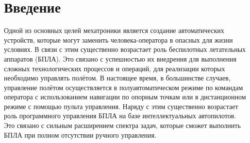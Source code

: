 \documentclass[a4paper, 14pt]{extarticle}
\let\Oldsection\section
\renewcommand{\section}{\FloatBarrier\Oldsection}
\begin{document}
\section{Введение}
Одной из основных целей мехатроники
является создание автоматических устройств, которые могут заменить
человека-оператора в опасных для жизни условиях. В связи с этим
существенно возрастает роль беспилотных летательных аппаратов (БПЛА).
Это связано с успешностью их внедрения для выполнения сложных
технологических процессов и операций, для реализации которых
необходимо управлять полётом. В настоящее время, в большинстве случаев, управление полётом
осуществляется в полуавтоматическом режиме по командам оператора с
использованием навигации по опорным точкам или в дистанционном режиме
с помощью пульта управления. Наряду с этим существенно возрастает роль
программного управления БПЛА на базе интеллектуальных автопилотов. Это связано с сильным расширением спектра задач, которые сможет выполнить БПЛА при полном отсутствии ручного управления. \par
\end{document}
